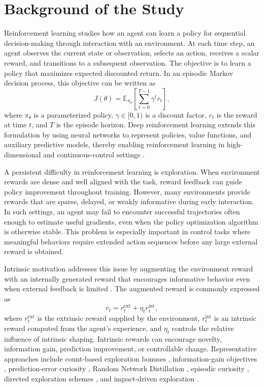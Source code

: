 \section{Background of the Study}
\label{sec:background_of_the_study}

Reinforcement learning studies how an agent can learn a policy for sequential decision-making through interaction with an environment.
At each time step, an agent observes the current state or observation, selects an action, receives a scalar reward, and transitions to a subsequent observation.
The objective is to learn a policy that maximizes expected discounted return.
In an episodic Markov decision process, this objective can be written as
\begin{equation}
    J(\theta)=\mathbb{E}_{\pi_\theta}\left[\sum_{t=0}^{T-1}\gamma^t r_t\right],
\end{equation}
where $\pi_\theta$ is a parameterized policy, $\gamma \in [0,1)$ is a discount factor, $r_t$ is the reward at time $t$, and $T$ is the episode horizon.
Deep reinforcement learning extends this formulation by using neural networks to represent policies, value functions, and auxiliary predictive models, thereby enabling reinforcement learning in high-dimensional and continuous-control settings \parencite{barto-2012}.

A persistent difficulty in reinforcement learning is exploration.
When environment rewards are dense and well aligned with the task, reward feedback can guide policy improvement throughout training.
However, many environments provide rewards that are sparse, delayed, or weakly informative during early interaction.
In such settings, an agent may fail to encounter successful trajectories often enough to estimate useful gradients, even when the policy optimization algorithm is otherwise stable.
This problem is especially important in control tasks where meaningful behaviors require extended action sequences before any large external reward is obtained.

Intrinsic motivation addresses this issue by augmenting the environment reward with an internally generated reward that encourages informative behavior even when external feedback is limited \parencite{singh-2004,barto-2012,oudeyer-2007A,oudeyer-2007B}.
The augmented reward is commonly expressed as
\begin{equation}
    r_t = r_t^{\mathrm{ext}} + \eta_t r_t^{\mathrm{int}},
\end{equation}
where $r_t^{\mathrm{ext}}$ is the extrinsic reward supplied by the environment, $r_t^{\mathrm{int}}$ is an intrinsic reward computed from the agent's experience, and $\eta_t$ controls the relative influence of intrinsic shaping.
Intrinsic rewards can encourage novelty, information gain, prediction improvement, or controllable change.
Representative approaches include count-based exploration bonuses \parencite{bellemare-2016,tang-2016,ostrovski-2017}, information-gain objectives \parencite{houthooft-2016}, prediction-error curiosity \parencite{stadie-2015,pathak-2017}, Random Network Distillation \parencite{burda-2018B,burda-2018A}, episodic curiosity \parencite{savinov-2018}, directed exploration schemes \parencite{badia-2020}, and impact-driven exploration \parencite{raileanu-2020}.

